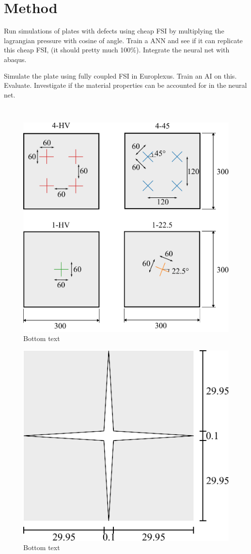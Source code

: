 \chapter{Method} \label{CH4}
Run simulations of plates with defects using cheap FSI by multiplying the lagrangian pressure with cosine of angle. Train a ANN and see if it can replicate this cheap FSI, (it should pretty much 100\%). Integrate the neural net with abaqus.

Simulate the plate using fully coupled FSI in Europlexus. Train an AI on this. Evaluate. Investigate if the material properties can be accounted for in the neural net.

\
\begin{figure}
    \centering
    \includegraphics[width=.8\textwidth]{Chapter/04_method/figures/plates.pdf}
    \caption{Bottom text}
    \label{fig:plates}
\end{figure}

\begin{figure}
    \centering
    \includegraphics[width=.5\textwidth]{Chapter/04_method/figures/slit.pdf}
    \caption{Bottom text}
    \label{fig:slit}
\end{figure}

